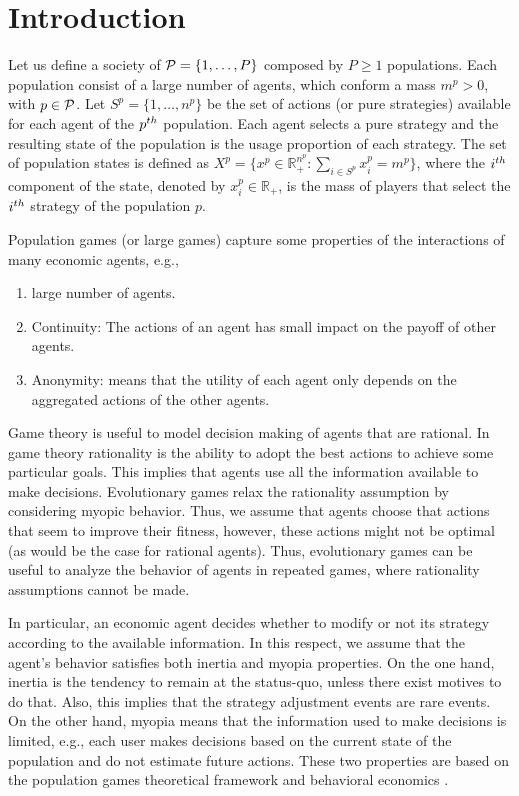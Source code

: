 \section{Introduction} \label{sec:introduction}



Let us define a society of $\mathcal{P} = \{ 1, \ldots, P\}$ composed by $P \geq 1$ populations. Each population consist of a large number of agents, which conform a mass $m^p > 0$, with $p \in \mathcal{P}$. 
Let $S^p = \{ 1, \ldots, n^p \}$ be the set of actions (or pure strategies) available for each agent of the $p^{th}$ population. 
Each agent selects a pure strategy and the resulting state of the population is the usage proportion of each strategy. The set of population states is defined as $X^p = \{ x^p \in \mathbb{R}_+^{n^p} : \sum_{i \in S^p} x_i^p = m^p \}$, where the $i^{th}$ component of the state, denoted by $x_i^p \in \mathbb{R}_+$, is the mass of players that select the $i^{th}$ strategy of the population $p$.

Population games (or large games) capture some properties of the interactions of many economic agents, e.g., 

\begin{enumerate}
\item large number of agents.
\item Continuity: The actions of an agent has small impact on the payoff of other agents.
\item Anonymity: means that the utility of each agent only depends on the aggregated actions of the other agents.
\end{enumerate}

Game theory is useful to model decision making of agents that are rational. In game theory rationality is the ability to adopt the best actions to achieve some particular goals. This implies that agents use all the information available to make decisions. Evolutionary games relax the rationality assumption by considering myopic behavior. Thus, we assume that agents choose that actions that seem to improve their fitness, however, these actions might not be optimal (as would be the case for rational agents). Thus, evolutionary games can be useful to analyze the behavior of agents in repeated games, where rationality assumptions cannot be made. 


In particular, an economic agent decides whether to modify or not its strategy according to the available information. In this respect, we assume that the agent's behavior satisfies both inertia and myopia properties. On the one hand, inertia 
is the tendency to remain at the status-quo, unless there exist motives to do that.
Also, this implies that the strategy adjustment events are rare events.
On the other hand, myopia means that the information used to make decisions is limited, e.g., each user makes decisions based on the current state of the population and do not estimate future actions. These two properties are based on the population games theoretical framework \cite{sandholm_book}
and behavioral economics \cite{gal}.

